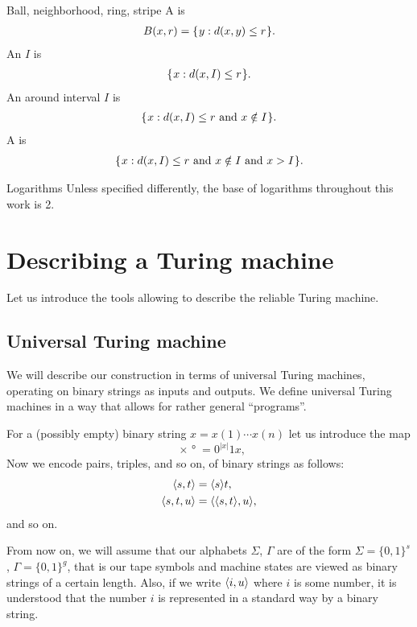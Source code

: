 \documentclass[12pt]{memoir}
\renewcommand{\le}{\leq}
\begin{document}
\begin{flushdescription}
\item [Ball, neighborhood, ring, stripe]
A  is
\begin{align*}
    B(x,r)= \setOf{y}{d(x,y)\le r}.
\end{align*}
An  \( I \) is
\begin{align*}
    \setOf{x}{d(x,I)\le r}.
\end{align*}
An  around interval \( I \) is
\begin{align*}
    \setOf{x}{d(x,I)\le r \txt{ and } x \notin I}.
\end{align*}
A  is
\begin{align*}
    \setOf{x}{d(x,I)\le r \txt{ and } x \notin I \txt{ and } x>I}.
\end{align*}

\item[Logarithms] Unless specified differently,
the base of logarithms throughout this work is 2.

\end{flushdescription}


\section{Describing a Turing machine}\label{sec:describing}

Let us introduce the tools allowing to describe the reliable Turing machine.

\subsection{Universal Turing machine}\label{sec:UTM}

We will describe our construction in terms of
universal Turing machines,
operating on binary strings as inputs and outputs.
We define universal Turing machines in a way that allows
for rather general ``programs''.

 \begin{definition}
For a (possibly empty) binary string \( x=x(1)\dotsm x(n) \) let us introduce the map
 \[
   \ang{x} = 0^{|x|}1 x,
 \]
Now we encode pairs, triples, and so on, of binary strings as follows:
 \begin{align*}
        {\mathopen\langle s,t\mathclose\rangle} &={\mathopen\langle s\mathclose\rangle}t,
\\ {\mathopen\langle s,t,u\mathclose\rangle} &= {\mathopen\langle {\mathopen\langle s,t\mathclose\rangle},u\mathclose\rangle},
 \end{align*}
and so on.

From now on, we will assume that our alphabets \( \Sigma \), \( \Gamma \)
are of the form \( \Sigma=\{0,1\}^{s} \), \( \Gamma=\{0,1\}^{g} \), that is 
our tape symbols and machine states are viewed as binary strings of a certain length.
Also, if we write \( {\mathopen\langle i,u\mathclose\rangle} \) where \( i \) is some number, it is understood
that the number \( i \) is represented in a standard way by a binary string.
\end{definition}
\end{document}
